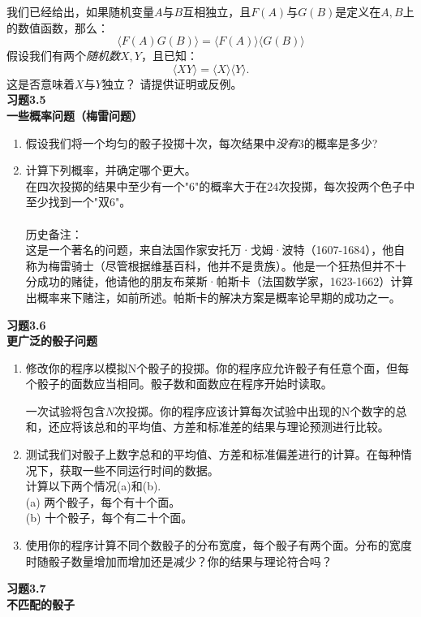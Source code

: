 \documentclass[UTF8]{ctexart}
\numberwithin{equation}{section}%
\numberwithin{figure}{section}%
\begin{document}
    我们已经给出，如果随机变量$A$与$B$互相独立，且$F(A)$与$G(B)$是定义在$A,B$上的数值函数，那么：
    \begin{equation*}
        \langle F(A) G(B)\rangle=\langle F(A)\rangle\langle G(B)\rangle
    \end{equation*}
    假设我们有两个\textit{随机数}$X,Y$，且已知：
    \begin{equation*}
        \langle{XY}\rangle=\langle{X}\rangle\langle{Y}\rangle.
    \end{equation*}
    这是否意味着$X$与$Y$独立？
    请提供证明或反例。\\
    \textbf{习题3.5}\label{prob3.5}\\
    \textbf{一些概率问题（梅雷问题）}\\
    \begin{enumerate}
        \item 假设我们将一个均匀的骰子投掷十次，每次结果中\textit{没有}3的概率是多少?
        \item 计算下列概率，并确定哪个更大。\\
        在四次投掷的结果中至少有一个"6"的概率大于在24次投掷，每次投两个色子中至少找到一个"双6"。
        \\\\历史备注：\\
        这是一个著名的问题，来自法国作家安托万·戈姆·波特（1607-1684），他自称为梅雷骑士（尽管根据维基百科，他并不是贵族）。他是一个狂热但并不十分成功的赌徒，他请他的朋友布莱斯·帕斯卡（法国数学家，1623-1662）计算出概率来下赌注，如前所述。帕斯卡的解决方案是概率论早期的成功之一。
    \end{enumerate}
    \textbf{习题3.6}\label{prob3.6}\\
    \textbf{更广泛的骰子问题}\\
    \begin{enumerate}
        \item 修改你的程序以模拟N个骰子的投掷。你的程序应允许骰子有任意个面，但每个骰子的面数应当相同。骰子数和面数应在程序开始时读取。
    
        一次试验将包含$N$次投掷。你的程序应该计算每次试验中出现的N个数字的总和，还应将该总和的平均值、方差和标准差的结果与理论预测进行比较。
        \item 测试我们对骰子上数字总和的平均值、方差和标准偏差进行的计算。在每种情况下，获取一些不同运行时间的数据。\\
        计算以下两个情况(a)和(b).\\
        (a) 两个骰子，每个有十个面。\\
        (b) 十个骰子，每个有二十个面。
        \item 使用你的程序计算不同个数骰子的分布宽度，每个骰子有两个面。分布的宽度时随骰子数量增加而增加还是减少？你的结果与理论符合吗？
    \end{enumerate}
    \textbf{习题3.7}\label{prob3.7}\\
    \textbf{不匹配的骰子}\\
    
\end{document}
